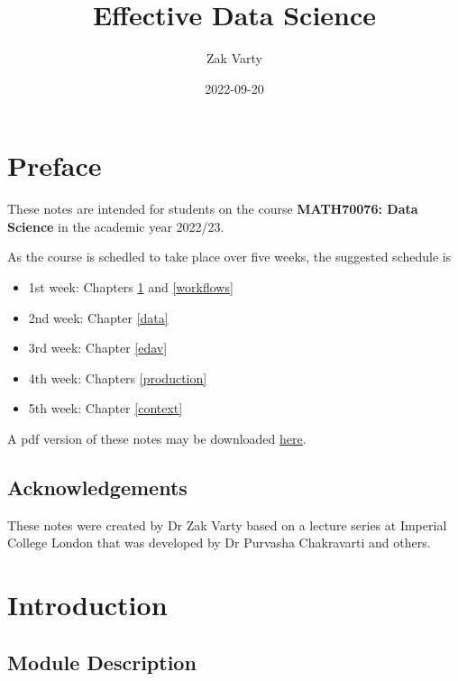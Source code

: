 \documentclass[
  12pt,
]{book}
\title{Effective Data Science}
\author{Zak Varty}
\date{2022-09-20}
\providecommand{\tightlist}{%
  \setlength{\itemsep}{0pt}\setlength{\parskip}{0pt}}
\theoremstyle{definition}
\theoremstyle{definition}
\theoremstyle{definition}
\theoremstyle{definition}
\theoremstyle{remark}
\begin{document}
\maketitle

{
\setcounter{tocdepth}{1}
\tableofcontents
}
\hypertarget{preface}{%
\chapter*{Preface}\label{preface}}

These notes are intended for students on the course \textbf{MATH70076: Data Science} in the academic year 2022/23.

As the course is schedled to take place over five weeks, the suggested schedule is

\begin{itemize}
\tightlist
\item
  1st week: Chapters \ref{intro} and \ref{workflows}
\item
  2nd week: Chapter \ref{data}
\item
  3rd week: Chapter \ref{edav}
\item
  4th week: Chapters \ref{production}
\item
  5th week: Chapter \ref{context}
\end{itemize}

A pdf version of these notes may be downloaded \href{./data_science_notes.pdf}{here}.

\hypertarget{acknowledgements}{%
\section*{Acknowledgements}\label{acknowledgements}}

These notes were created by Dr Zak Varty based on a lecture series at Imperial College London that was developed by Dr Purvasha Chakravarti and others.

\hypertarget{intro}{%
\chapter{Introduction}\label{intro}}

\hypertarget{module-description}{%
\section{Module Description}\label{module-description}}
\end{document}
